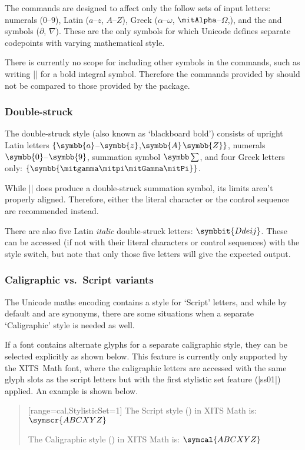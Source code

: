 The  commands are designed to affect only the follow sets of input letters: numerals ($0$--$9$), Latin ($a$--$z$, $A$--$Z$), Greek ($\alpha$--$\omega$, $\Alpha$--$\Omega$,), and the  and  symbols ($\partial$, $\nabla$).
These are the only symbols for which Unicode defines separate codepoints with varying mathematical style.

There is currently no scope for including other symbols in the  commands, such as writing |\symbf{\int}| for a bold integral symbol.
Therefore the commands provided by  should not be compared to those provided by the  package.

\subsubsection{Double-struck}

The double-struck style (also known as `blackboard bold') consists of
upright Latin letters $\{\symbb{a}$--$\symbb{z}$,$\symbb{A}$$\symbb{Z}\}$,
numerals $\symbb{0}$--$\symbb{9}$, summation symbol $\symbb\sum$, and four
Greek letters only: $\{\symbb{\gamma\pi\Gamma\Pi}\}$.

While |\symbb{\sum}| does produce a double-struck summation symbol,
its limits aren't properly aligned. Therefore,
either the literal character or the control sequence  are
recommended instead.

There are also five Latin \emph{italic} double-struck letters: $\symbbit{Ddeij}$.
These can be accessed (if not with their literal characters or control sequences)
with the  style switch, but note that only those five letters
will give the expected output.

\subsubsection{Caligraphic vs.\ Script variants}

The Unicode maths encoding contains a style for `Script' letters,
and while by default  and 
are synonyms, there are some situations when a
separate `Caligraphic' style is needed as well.

If a font contains alternate glyphs for a separate caligraphic style,
they can be selected explicitly as shown below.
This feature is currently only supported by the XITS~Math font, where
the caligraphic letters are accessed with the same glyph slots as the
script letters but with the first stylistic set feature (|ss01|) applied.
An example is shown below.
\begin{quote}
[range=cal,StylisticSet=1]
The Script style () in XITS Math is: $\symscr{ABCXYZ}$\par
The Caligraphic style () in XITS Math is: $\symcal{ABCXYZ}$
\end{quote}


